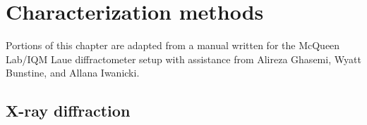 \chapter{Characterization methods} \label{chap:chap-1}



\begin{singlespace}         %
    Portions of this chapter are adapted from a manual written for the McQueen Lab/IQM Laue diffractometer setup with assistance from Alireza Ghasemi, Wyatt Bunstine, and Allana Iwanicki.

\end{singlespace} 
\section{X-ray diffraction}
